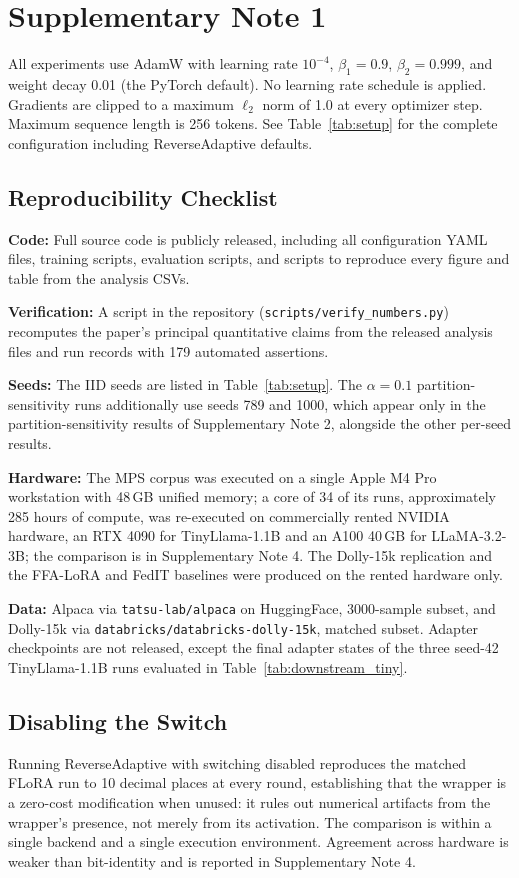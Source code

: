 \documentclass[pdflatex,sn-nature]{sn-jnl}
\begin{document}
\section*{Supplementary Note 1}
\label{app:hyper}
All experiments use AdamW \cite{loshchilov2019decoupled} with learning rate $10^{-4}$, $\beta_1{=}0.9$, $\beta_2{=}0.999$, and weight decay 0.01 (the PyTorch default). No learning rate schedule is applied. Gradients are clipped to a maximum $\ell_2$ norm of 1.0 at every optimizer step. Maximum sequence length is 256 tokens. See Table~\ref{tab:setup} for the complete configuration including ReverseAdaptive defaults.

\subsection{Reproducibility Checklist}
\label{app:repro}
\textbf{Code:} Full source code is publicly released, including all configuration YAML files, training scripts, evaluation scripts, and scripts to reproduce every figure and table from the analysis CSVs.

\textbf{Verification:} A script in the repository (\texttt{scripts/verify\_numbers.py}) recomputes the paper's principal quantitative claims from the released analysis files and run records with 179 automated assertions.

\textbf{Seeds:} The IID seeds are listed in Table~\ref{tab:setup}. The $\alpha{=}0.1$ partition-sensitivity runs additionally use seeds 789 and 1000, which appear only in the partition-sensitivity results of Supplementary Note 2, alongside the other per-seed results.

\textbf{Hardware:} The MPS corpus was executed on a single Apple M4 Pro workstation with 48\,GB unified memory; a core of 34 of its runs, approximately 285 hours of compute, was re-executed on commercially rented NVIDIA hardware, an RTX 4090 for TinyLlama-1.1B and an A100 40\,GB for LLaMA-3.2-3B; the comparison is in Supplementary Note 4. The Dolly-15k replication and the FFA-LoRA and FedIT baselines were produced on the rented hardware only.

\textbf{Data:} Alpaca \cite{taori2023alpaca} via \texttt{tatsu-lab/alpaca} on HuggingFace, 3000-sample subset, and Dolly-15k \cite{dolly2023} via \texttt{databricks/databricks-dolly-15k}, matched subset. Adapter checkpoints are not released, except the final adapter states of the three seed-42 TinyLlama-1.1B runs evaluated in Table~\ref{tab:downstream_tiny}.

\subsection{Disabling the Switch}
\label{app:noswitch}
Running ReverseAdaptive with switching disabled reproduces the matched FLoRA \cite{wang2024flora} run to 10 decimal places at every round, establishing that the wrapper is a zero-cost modification when unused: it rules out numerical artifacts from the wrapper's presence, not merely from its activation. The comparison is within a single backend and a single execution environment. Agreement across hardware is weaker than bit-identity and is reported in Supplementary Note 4.
\end{document}
